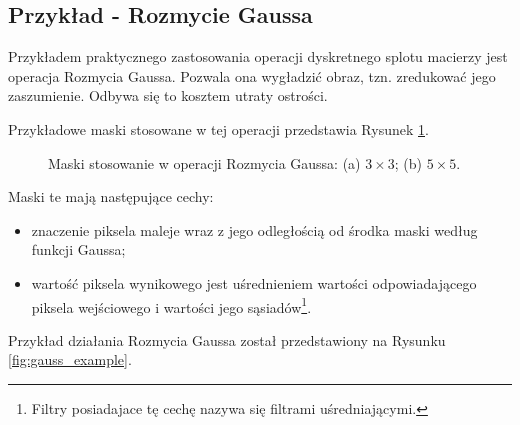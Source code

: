 \documentclass[a4paper,twocolumn,12pt]{article}
\begin{document}
\subsection{Przykład - Rozmycie Gaussa} \label{sec:gauss}

Przykładem praktycznego zastosowania operacji dyskretnego splotu macierzy jest operacja Rozmycia Gaussa.
Pozwala ona wygładzić obraz, tzn. zredukować jego zaszumienie.
Odbywa się to kosztem utraty ostrości.

Przykładowe maski stosowane w tej operacji przedstawia Rysunek \ref{fig:gauss_matrices}.

\begin{figure}[!ht]
 \begin{center}
 \end{center}
 \caption{
  Maski stosowanie w operacji Rozmycia Gaussa:
  (a) $3 \times 3$;
  (b) $5 \times 5$.
 }
 \label{fig:gauss_matrices}
\end{figure}

Maski te mają następujące cechy:

\begin{itemize}
 \item znaczenie piksela maleje wraz z jego odległością od środka maski według funkcji Gaussa;
 \item wartość piksela wynikowego jest uśrednieniem wartości odpowiadającego piksela wejściowego i wartości jego sąsiadów\footnote{Filtry posiadajace tę cechę nazywa się filtrami uśredniającymi.}.
\end{itemize}

Przykład działania Rozmycia Gaussa został przedstawiony na Rysunku \ref{fig:gauss_example}.
\end{document}
